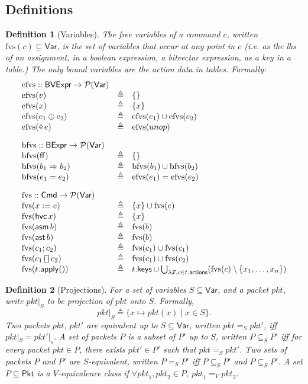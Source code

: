 \documentclass{article}
\newcommand{\pkt}{\mathit{pkt}}
\newcommand{\FALSE}{\mathsf{ff}}
\newcommand{\binop}{\mathbin{\oplus}}
\newcommand{\unop}{\mathop{\text{\pointer}}}
\newcommand{\BVExpr}{\mathsf{BVExpr}}
\newcommand{\BExpr}{\mathsf{BExpr}}
\newcommand{\Cmd}{\mathsf{Cmd}}
\newcommand{\Pkt}{\mathsf{Pkt}}
\newcommand{\Var}{\mathsf{Var}}
\newcommand{\actions}{\mathsf{actions}}
\newcommand{\keys}{\mathsf{keys}}
\newcommand{\assert}{\mathop{\mathsf{ast}}}
\newcommand{\assume}{\mathop{\mathsf{asm}}}
\newcommand{\apply}{\mathsf{apply}}
\newcommand{\choiceop}{\rotatebox[origin=c]{90}{$\sqsubset\!\!\!\sqsupset$}}
\newcommand{\choice}{\mathbin{\choiceop}}
\newcommand{\havoc}[1]{\mathop{\mathsf{hvc}}#1}
\newcommand{\fvs}{\textrm{fvs}}
\newcommand{\efvs}{\textrm{efvs}}
\newcommand{\bfvs}{\textrm{bfvs}}
\newtheorem{definition}{Definition}
\begin{document}
\subsection{Definitions}

\begin{definition}[Variables]
  The free variables of a command $c$, written $\fvs(c) \subseteq \Var$, is the
  set of variables that occur at any point in $c$ (i.e. as the lhs of an
  assignment, in a boolean expression, a bitvector expression, as a key in a
  table.) The only bound variables are the action data in tables. Formally:
  \[\begin{array}{l >{\triangleq}cl}
  \efvs :: \BVExpr \to \mathcal{P}(\Var) \\
  \efvs(v) && \{\} \\
  \efvs(x) && \{x\}\\
  \efvs(e_1 \binop e_2) && \efvs(e_1) \cup \efvs(e_2)\\
  \efvs(\unop e) && \efvs(unop) \\[1em]
  \bfvs :: \BExpr \to \mathcal{P}(\Var) \\
  \bfvs(\FALSE) && \{\}\\
  \bfvs(b_1 \Rightarrow b_2) && \bfvs(b_1) \cup \bfvs(b_2)\\
  \bfvs(e_1 = e_2) && \efvs(e_1) = \efvs(e_2) \\[1em]
  \fvs :: \Cmd \to \mathcal{P}(\Var) \\
  \fvs(x := e) && \{x\} \cup \fvs(e)\\
  \fvs(\havoc x) && \{x\}\\
  \fvs(\assume b) && \fvs(b)\\
  \fvs(\assert b) && \fvs(b) \\
  \fvs(c_1;c_2) && \fvs(c_1) \cup \fvs(c_1) \\
  \fvs(c_1 \choice c_2) && \fvs(c_1) \cup \fvs(c_2) \\
  \fvs(t.\apply()) &&
  t.\keys \cup \bigcup_{\lambda \vec x. c \in t.\actions} (\fvs(c) \setminus \{x_1,\ldots, x_n\})
  \end{array}\]
\end{definition}



\begin{definition}[Projections]
  For a set of variables $S \subseteq \Var$, and a packet $\pkt$, write
  $\pkt|_S$ to be projection of $\pkt$ onto $S$.  Formally,
  \[\pkt|_S \triangleq \{x \mapsto \pkt(x) \mid x \in S\}.\]
  Two packets $\pkt$, $\pkt'$ are equivalent up to $S \subseteq \Var$, written
  $\pkt =_S \pkt'$, iff $\pkt|_S = \pkt'|_s$. A set of packets $P$ is a subset
  of $P'$ up to $S$, written $P \subseteq_S P'$ iff for every packet $\pkt \in
  P$, there exists $\pkt' \in P'$ such that $\pkt =_S \pkt'$. Two sets of
  packets $P$ and $P'$ are $S$-equivalent, written $P =_S P'$ iff $P \subseteq_S
  P'$ and $P \subseteq_S P'$. A set $P \subseteq \Pkt$ is a $V$-equivalence
  class if $\forall \pkt_1, \pkt_2 \in P$, $\pkt_1 =_V \pkt_2$.
\end{definition}
\end{document}
